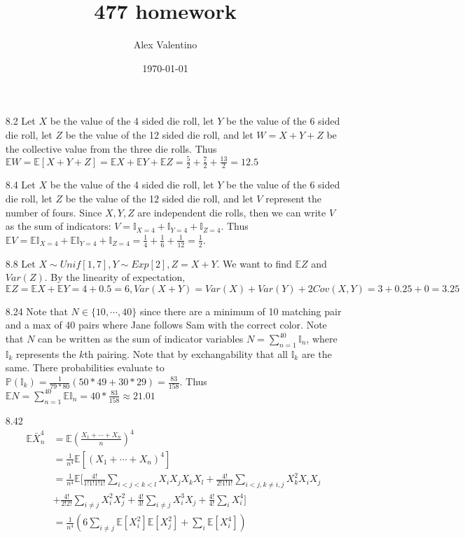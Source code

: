 \documentclass[12pt, letterpaper]{article}
\date{\today}
\author{Alex Valentino}
\title{477 homework}
\newcommand{\E}{\mathbb{E}}
\newcommand{\Pro}{\mathbb{P}}
\begin{document}
\begin{enumerate}
	\item[8.2] Let $X$ be the value of the 4 sided die roll, let $Y$ be the value of the 6 sided die roll, let $Z$ be the value of the 12 sided die roll, and let 
	$W=X+Y+Z$ be the collective value from the three die rolls.
	Thus $\E W = \E[X+Y+Z] = \E X + \E Y + \E Z = \frac{5}{2} + \frac{7}{2} + \frac{13}{2} = 12.5$
	\item[8.4] Let $X$ be the value of the 4 sided die roll, let $Y$ be the value of the 6 sided die roll, let $Z$ be the value of the 12 sided die roll, and let $V$ represent the number of fours.  Since $X,Y,Z$ are independent die rolls, then 
	we can write $V$ as the sum of indicators: $V = \mathbb{I}_{X = 4} + \mathbb{I}_{Y = 4} +\mathbb{I}_{Z = 4}$.  Thus $\E V = \E \mathbb{I}_{X = 4} + \E \mathbb{I}_{Y = 4} + \mathbb{I}_{Z = 4} = \frac{1}{4} + \frac{1}{6} + \frac{1}{12} = \frac{1}{2}$.  
	\item[8.8] Let $X \sim Unif[1,7], Y \sim Exp[2], Z = X + Y$.  We want to find $\E Z$ 
	and $Var(Z)$.  By the linearity of expectation, $\E Z = \E X + \E Y = 4 + 0.5 = 6, Var(X+Y) = Var(X) + Var(Y) + 2Cov(X,Y) = 3 + 0.25 + 0 = 3.25$
	\item[8.24] Note that $N \in \{10,\cdots,40\}$ since there are a minimum of 10 matching pair and a max of 40 pairs where Jane follows Sam with the correct color.
	Note that $N$ can be written as the sum of indicator variables 
	$N = \sum_{n=1}^{40} \mathbb{I}_n$, where $\mathbb{I}_k$ represents the $k$th pairing.  Note that by exchangability that all $\mathbb{I}_k$ are the same.  
	There probabilities evaluate to $\Pro(\mathbb{I}_k) = \frac{1}{79 * 80} \left(
	50*49 + 30 * 29 \right) = \frac{83}{158}$.  Thus $\E N = \sum_{n=1}^{40} \E \mathbb{I}_n = 40 * \frac{83}{158}\approx 21.01 $
	\item[8.42]  
	\begin{align*}
		\E \bar{X}_n^4 &= \E \left( \frac{X_1 + \cdots + X_n}{n} \right)^4\\
		&= \frac{1}{n^4} \E [(X_1 + \cdots + X_n)^4]\\
		&= \frac{1}{n^4} \E [ \frac{4!}{1!1!1!1!}\sum_{i < j < k < l}X_i X_j X_k X_l + \frac{4!}{2!1!1!}\sum_{i<j, k \neq i,j} X_k^2 X_i X_j\\
		&+ \frac{4!}{2!2!} \sum_{i \neq j}X_i^2 X_j^2 + \frac{4!}{3!}\sum_{i\neq j}X_i^3 X_j + \frac{4!}{4!}\sum_{i} X_i^4]\\
		&= \frac{1}{n^4} \left( 6\sum_{i \neq j} \E[X_i^2] \E[X_j^2] + \sum_i \E[X_i^4] \right)\\

\end{align*}
\end{enumerate}
\end{document}

